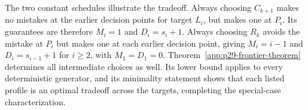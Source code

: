 The two constant schedules illustrate the tradeoff. Always choosing
$C_{k+1}$ makes no mistakes at the earlier decision points for target
$L_i$, but makes one at $P_i$. Its guarantees are therefore $M_i=1$
and $D_i=s_i+1$. Always choosing $R_k$ avoids the mistake at $P_i$
but makes one at each earlier decision point, giving $M_i=i-1$ and
$D_i=s_{i-1}+1$ for $i\ge2$, with $M_1=D_1=0$.
Theorem~\ref{app:p29-frontier-theorem} determines all intermediate
choices as well. Its lower bound applies to every deterministic generator,
and its minimality statement shows that each listed profile is an optimal
tradeoff across the targets, completing the special-case characterization.
